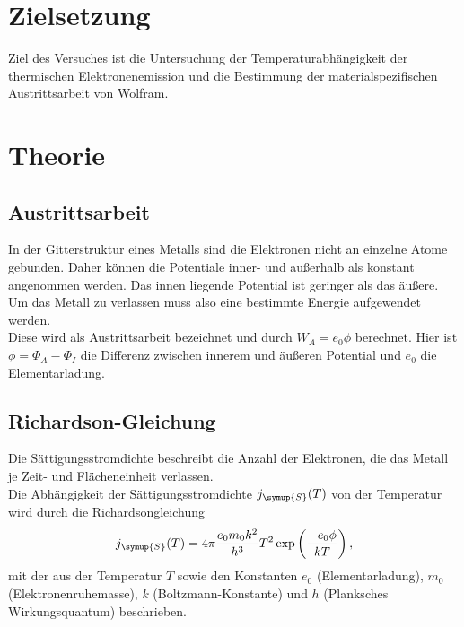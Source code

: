 \section{Zielsetzung}
Ziel des Versuches ist die Untersuchung der Temperaturabhängigkeit der thermischen Elektronenemission und die 
Bestimmung der materialspezifischen Austrittsarbeit von Wolfram. 

\section{Theorie}
\label{sec:Theorie}


\subsection{Austrittsarbeit}
In der Gitterstruktur eines Metalls sind die Elektronen nicht an einzelne Atome gebunden. Daher können die Potentiale inner- und außerhalb als konstant angenommen werden. 
Das innen liegende Potential ist geringer als das äußere. \\
Um das Metall zu verlassen muss also eine bestimmte Energie aufgewendet werden. \\
Diese wird als Austrittsarbeit bezeichnet und durch $W_A = e_0 \phi$ berechnet.
Hier ist $\phi = \Phi_A - \Phi_I$ die Differenz zwischen innerem und äußeren Potential und $e_0$ die Elementarladung. 

  

\subsection{Richardson-Gleichung}
Die Sättigungsstromdichte beschreibt die Anzahl der Elektronen, die das Metall je Zeit- und Flächeneinheit verlassen. \\
Die Abhängigkeit der Sättigungsstromdichte $j_{\symup{S}}(T)$ von der Temperatur wird durch die Richardsongleichung
\begin{equation}
  j_{\symup{S}}(T) = 4 \pi \frac{e_0 m_0 k^2}{h^3} T^2 \exp\left(\frac{-e_0 \phi}{k T} \right),
  \label{eq:richardson}
\end{equation}
mit der aus der Temperatur $T$ sowie den Konstanten $e_0$ (Elementarladung),
$m_0$ (Elektronenruhemasse), $k$ (Boltzmann-Konstante) und
$h$ (Planksches Wirkungsquantum) beschrieben.\\

